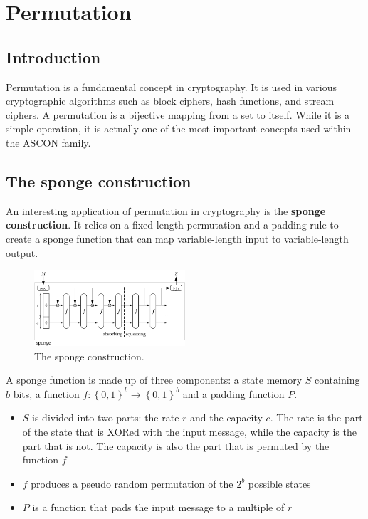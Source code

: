 \section{Permutation}
\subsection{Introduction}

Permutation is a fundamental concept in cryptography. It is used in various cryptographic algorithms such as block ciphers, hash functions, and stream ciphers. A permutation is a bijective mapping from a set to itself. While it is a simple operation, it is actually one of the most important concepts used within the ASCON family. \par


\subsection{The sponge construction}

An interesting application of permutation in cryptography is the \textbf{sponge construction}. It relies on a fixed-length permutation and a padding rule to create a sponge function that can map variable-length input to variable-length output. \cite{keccak_team} \par 


\begin{figure}[htbp]
  \centering
  \includegraphics[width=0.5\textwidth]{images/Sponge-150.png}
  \caption{The sponge construction.}
  \label{fig:sponge}
\end{figure}

\noindent A sponge function is made up of three components: a state memory $S$ containing $b$ bits, a function $f: \left\{0,1\right\}^b \rightarrow \left\{0,1\right\}^b$ and a padding function $P$.  \cite{keccak_team,sponge_function_2023}

\begin{itemize}
  \item $S$ is divided into two parts: the rate $r$ and the capacity $c$. The rate is the part of the state that is XORed with the input message, while the capacity is the part that is not. The capacity is also the part that is permuted by the function $f$
  \item $f$ produces a pseudo random permutation of the $2^b$ possible states
  \item $P$ is a function that pads the input message to a multiple of $r$
\end{itemize}

